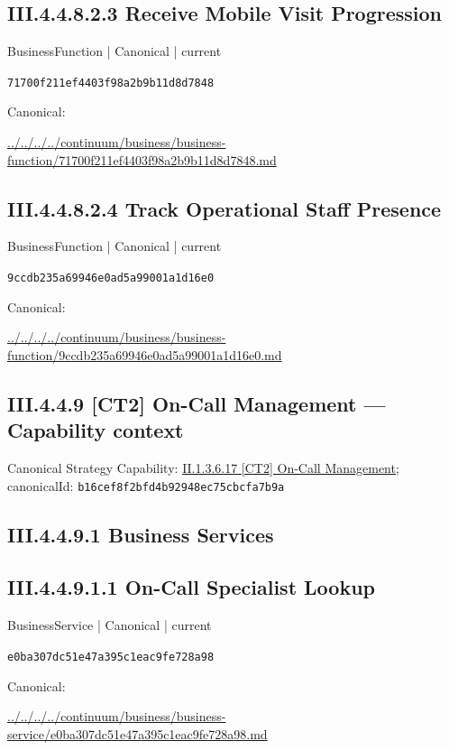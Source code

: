 \documentclass[10pt,a4paper]{article}
\begin{document}
\subsection*{III.4.4.8.2.3 Receive Mobile Visit Progression}
\label{element-71700f211ef4403f98a2b9b11d8d7848}
{\small BusinessFunction | Canonical | current}\par
\texttt{71700f211ef4403f98a2b9b11d8d7848}\par
Canonical: \par
{\footnotesize\url{../../../../continuum/business/business-function/71700f211ef4403f98a2b9b11d8d7848.md}}\par
\subsection*{III.4.4.8.2.4 Track Operational Staff Presence}
\label{element-9ccdb235a69946e0ad5a99001a1d16e0}
{\small BusinessFunction | Canonical | current}\par
\texttt{9ccdb235a69946e0ad5a99001a1d16e0}\par
Canonical: \par
{\footnotesize\url{../../../../continuum/business/business-function/9ccdb235a69946e0ad5a99001a1d16e0.md}}\par
\subsection*{III.4.4.9 [CT2] On-Call Management — Capability context}
Canonical Strategy Capability: \hyperref[element-b16cef8f2bfd4b92948ec75cbcfa7b9a]{II.1.3.6.17 [CT2] On-Call Management}; canonicalId: \texttt{b16cef8f2bfd4b92948ec75cbcfa7b9a}\par
\subsection*{III.4.4.9.1 Business Services}
\subsection*{III.4.4.9.1.1 On-Call Specialist Lookup}
\label{element-e0ba307dc51e47a395c1eac9fe728a98}
{\small BusinessService | Canonical | current}\par
\texttt{e0ba307dc51e47a395c1eac9fe728a98}\par
Canonical: \par
{\footnotesize\url{../../../../continuum/business/business-service/e0ba307dc51e47a395c1eac9fe728a98.md}}\par
\end{document}
